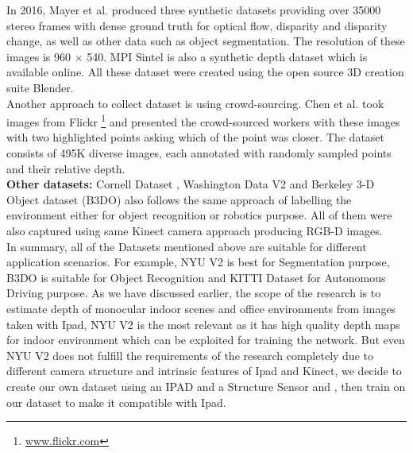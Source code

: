 In 2016, Mayer et al. \cite{MIFDB16} produced three synthetic datasets providing over 35000 stereo frames with dense ground truth for optical flow, disparity and disparity change, as well as other data such as object segmentation. The resolution of these images is 960 $\times$ 540. MPI Sintel \cite{Butler:ECCV:2012} is also a synthetic depth dataset which is available online. All these dataset were created using the open source 3D creation suite Blender.\\

Another approach to collect dataset is using crowd-sourcing. Chen et al. \cite{DBLP:journals/corr/ChenFYD16} took images from Flickr \footnote{ \url{www.flickr.com}}  and presented the crowd-sourced workers with these images with two highlighted points asking which of the point was closer. The dataset consists of 495K diverse images, each annotated with randomly sampled points and their relative depth.\\

\textbf{Other datasets:}  Cornell Dataset \cite{3Dscene} , Washington Data V2 \cite{Washington} and  Berkeley 3-D Object dataset (B3DO) \cite{Janoch:EECS-2012-85} also follows the same approach of labelling the environment either for object recognition or robotics purpose. All of them were also captured using same Kinect camera approach producing RGB-D images.\\

In summary, all of the Datasets mentioned above are suitable for different application scenarios. For example, NYU V2 \cite{Silberman:ECCV12} is best for Segmentation purpose, B3DO \cite{Janoch:EECS-2012-85} is suitable for Object Recognition and KITTI Dataset \cite{Geiger2013IJRR} for Autonomous Driving purpose. As we have discussed earlier, the scope of the research is to estimate depth of monocular indoor scenes and office environments from  images taken with Ipad, NYU V2 is the most relevant as it has high quality depth maps for indoor environment which can be exploited for training the network. But even NYU V2 does not fulfill the requirements of the research completely due to different camera structure and intrinsic features of Ipad and Kinect, we decide to create our own dataset using an IPAD and a Structure Sensor and   , then train on our dataset to make it compatible with Ipad.





